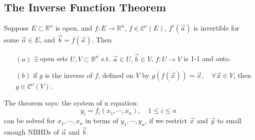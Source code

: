 \subsection{The Inverse Function Theorem}
\begin{theorem}
    Suppose   $ E\subset \mathbb{R}^n $ is open, and  $ f:E\rightarrow \mathbb{R}^n $,  $ f\in \mathscr{C}'(E)   $,  $ f'(\vec{a}) $ is invertible for some  $ \vec{a}\in E  $, and  $ \vec{b}=f(\vec{a}) $.
    Then \begin{enumerate}
        \item[$ (a) $] $ \exists  $ open sets  $ U,V\subset \mathbb{R}^n  $ s.t. $ \vec{a}\in U, \vec{b}\in V  $,  $ f:U\rightarrow V  $ is 1-1 and onto.
        \item[$ (b) $] if  $ g  $ is the inverse of  $ f  $, defined on  $ V  $ by  $ g(f(\vec{x}))=\vec{x},\quad\forall \vec{x}\in V     $, then  $ g\in \mathscr{C}'(V) $.  
    \end{enumerate}   
\end{theorem}
\begin{remark}
    The theorem says: the system of n equation:
    \[y_i=f_i(x_1,\cdots,x_n),\quad1 \leqslant i \leqslant n\]
    can be solved for  $ x_1,\cdots,x_n  $ in terms of  $ y_1,\cdots,y_n  $, if we restrict  $ \vec{x }  $ and  $ \vec{y} $ to small enough NBHDs of  $ \vec{a}  $ and  $ \vec{b} $.  
\end{remark}
